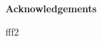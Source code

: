 \thispagestyle{plain}
\vspace*{\fill}
    \begin{center}
        \Large
        \textbf{Acknowledgements}
    \end{center}

    \vspace{1cm}

    fff2
\vspace*{\fill}
